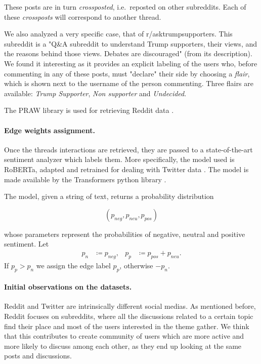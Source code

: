 These posts are in turn \emph{crossposted}, i.e.\ reposted on other subreddits. Each of
these \emph{crossposts} will correspond to another thread.

We also analyzed a
very specific case, that of r/asktrumpsupporters. This subreddit is a "Q\&A
subreddit to understand Trump supporters, their views, and the reasons behind
those views. Debates are discouraged" (from its description). We found it interesting as it provides an explicit labeling of the
users who, before commenting in any of these posts, must "declare" their side
by choosing a \emph{flair}, which is shown next to the username of the person
commenting.  Three flairs are available: \emph{Trump Supporter}, \emph{Non
	supporter} and \emph{Undecided}.

The PRAW library is used for retrieving Reddit data \cite{praw}.

\paragraph{Edge weights assignment.}%
\label{par:assigning_edge_weights}

Once the threads interactions are retrieved, they are passed to a state-of-the-art
sentiment analyzer which labels them. More specifically, the model used is
RoBERTa, adapted and retrained for dealing with Twitter
data \cite{Barbieri2020}. The model is made available by the Transformers
python library \cite{wolf-etal-2020-transformers}.

The model, given a string of text, returns a probability distribution

\begin{equation*}
	(p_{neg}, p_{neu}, p_{pos})
\end{equation*}

whose parameters represent the probabilities of negative,
neutral and positive sentiment. Let
\begin{align}
	\label{eq:}
	p_n & \coloneqq p_{neg}, & p_p & \coloneqq p_{pos} + p_{neu}.
\end{align}
If $p_p > p_n $ we assign the edge label $p_p$, otherwise $-p_n$.

%

\paragraph{Initial observations on the datasets.}
\label{sub:some_observations_on_the_datasets}
Reddit and Twitter are intrinsically different social medias. As mentioned
before, Reddit focuses on subreddits, where all the discussions related to a
certain topic find their place and most of the users interested in the
theme gather. We think that this contributes to create community of users which are more
active and more likely to discuss among each other, as they end up looking at the
same posts and discussions.

